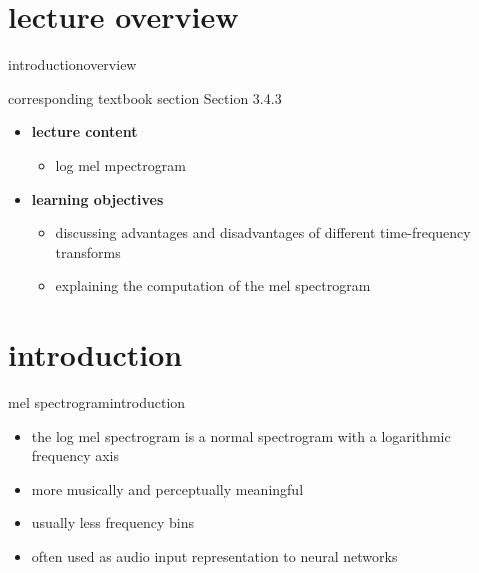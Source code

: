 


\subtitle{Module 3.4.3: Time-Frequency Representations~---~(Log) Mel-Spectrogram}


	

    \section[overview]{lecture overview}
        \begin{frame}{introduction}{overview}
            \begin{block}{corresponding textbook section}
                    Section 3.4.3
            \end{block}

            \begin{itemize}
                \item   \textbf{lecture content}
                    \begin{itemize}
                        \item   log mel mpectrogram
                    \end{itemize}
                \bigskip
                \item<2->   \textbf{learning objectives}
                    \begin{itemize}
                        \item   discussing advantages and disadvantages of different time-frequency transforms
                        \item   explaining the computation of the mel spectrogram
                    \end{itemize}
            \end{itemize}
        \end{frame}
        
    \section[intro]{introduction}
        \begin{frame}{mel spectrogram}{introduction}
            \begin{itemize}
                \item   the log mel spectrogram is a normal spectrogram with a logarithmic frequency axis
                \bigskip
                \item   more musically and perceptually meaningful
                \item   usually less frequency bins
                \item   often used as audio input representation to neural networks
            \end{itemize}
        \end{frame}
        
